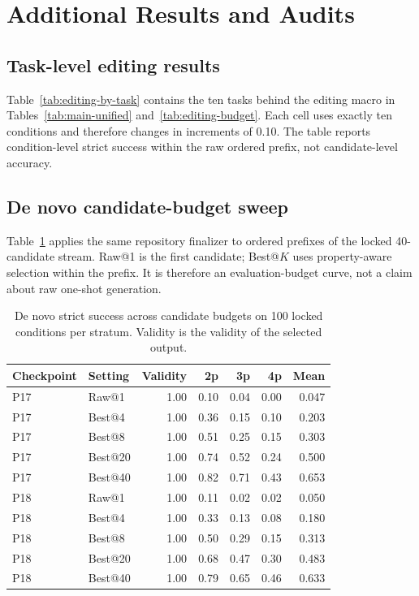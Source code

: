 \section{Additional Results and Audits}
\label{sec:appendix-results}

\subsection{Task-level editing results}
\label{sec:appendix-editing}

Table~\ref{tab:editing-by-task} contains the ten tasks behind the editing macro
in Tables~\ref{tab:main-unified} and~\ref{tab:editing-budget}. Each cell uses
exactly ten conditions and therefore changes in increments of 0.10. The table
reports condition-level strict success within the raw ordered prefix, not
candidate-level accuracy.



\subsection{De novo candidate-budget sweep}
\label{sec:appendix-denovo-budget}

Table~\ref{tab:denovo-budget} applies the same repository finalizer to ordered
prefixes of the locked 40-candidate stream. Raw@1 is the first candidate;
Best@$K$ uses property-aware selection within the prefix. It is therefore an
evaluation-budget curve, not a claim about raw one-shot generation.

\begin{table}[h]
  \centering
  \caption{De novo strict success across candidate budgets on 100 locked
  conditions per stratum. Validity is the validity of the selected output.}
  \label{tab:denovo-budget}
  \small
  \setlength{\tabcolsep}{5pt}
  \begin{tabular}{llrrrrr}
    \toprule
    Checkpoint & Setting & Validity & 2p & 3p & 4p & Mean \\
    \midrule
    P17 & Raw@1    & 1.00 & 0.10 & 0.04 & 0.00 & 0.047 \\
    P17 & Best@4   & 1.00 & 0.36 & 0.15 & 0.10 & 0.203 \\
    P17 & Best@8   & 1.00 & 0.51 & 0.25 & 0.15 & 0.303 \\
    P17 & Best@20  & 1.00 & 0.74 & 0.52 & 0.24 & 0.500 \\
    P17 & Best@40  & 1.00 & 0.82 & 0.71 & 0.43 & 0.653 \\
    \midrule
    P18 & Raw@1    & 1.00 & 0.11 & 0.02 & 0.02 & 0.050 \\
    P18 & Best@4   & 1.00 & 0.33 & 0.13 & 0.08 & 0.180 \\
    P18 & Best@8   & 1.00 & 0.50 & 0.29 & 0.15 & 0.313 \\
    P18 & Best@20  & 1.00 & 0.68 & 0.47 & 0.30 & 0.483 \\
    P18 & Best@40  & 1.00 & 0.79 & 0.65 & 0.46 & 0.633 \\
    \bottomrule
  \end{tabular}
\end{table}

